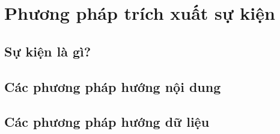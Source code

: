 
\chapter{Phương pháp trích xuất sự kiện} %



\section{Sự kiện là gì?}
\section{Các phương pháp hướng nội dung}


\section{Các phương pháp hướng dữ liệu}





